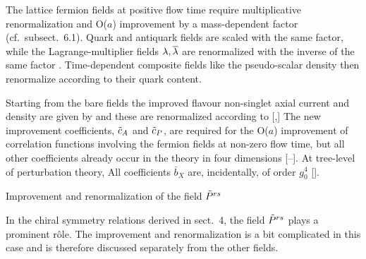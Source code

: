 The lattice fermion fields at positive flow time require multiplicative 
renormalization and O($a$) improvement by a mass-dependent factor
(cf.~subsect.~6.1).
Quark and anti\-quark fields 
are scaled with the same factor,
while the Lagrange-multiplier fields $\lambda,\overline{\lambda}$ 
are renormalized with the inverse of the same factor%
\kern1pt.
Time-dependent composite fields like the 
pseudo-scalar density 
then renormalize according to their quark content.

Starting from the bare fields
the improved flavour non-singlet axial current and density are
given by
and these are renormalized according to [\cite{SFimp},\cite{ImpNonD}]
The new improvement coefficients, $\tilde{c}_A$ and $\tilde{c}_P$, are required for
the O($a$) improvement of correlation functions involving the fermion
fields at non-zero flow time, but all other coefficients already
occur in the theory in four dimensions [\cite{SW}--\cite{ImpNonD}].
At tree-level of perturbation theory,
All coefficients $\bar{b}_X$ are, incidentally, of order $g_0^4$
[\cite{ImpNonD}].


 Improvement and renormalization of the field $\tilde{P}^{rs}$

In the chiral symmetry relations derived in 
sect.~4, the field $\tilde{P}^{rs}$ plays a prominent r\^ole.
The improvement and renormalization is a bit complicated 
in this case and is therefore discussed separately from the
other fields.

